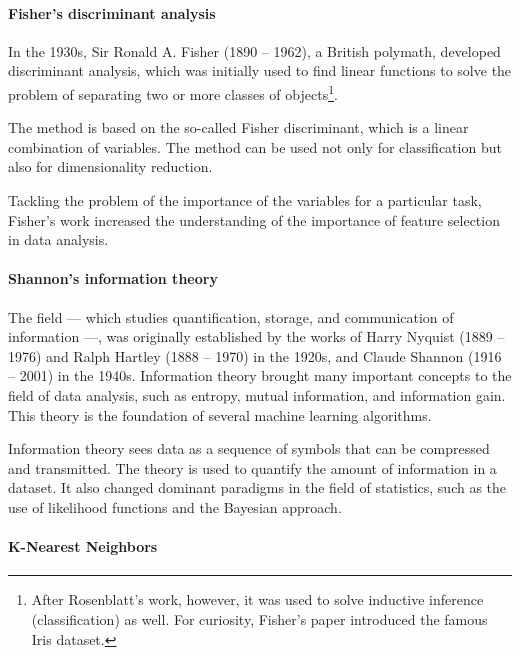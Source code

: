\paragraph{Fisher's discriminant analysis}

In the 1930s, Sir Ronald A. Fisher (1890 -- 1962), a British polymath, developed
discriminant analysis,
which was initially used to find linear functions to solve the problem of separating two or
more classes of objects\footnote{After Rosenblatt's work, however, it was used to solve
inductive inference (classification) as well.  For curiosity, Fisher's paper
introduced the famous Iris dataset.}.

The method is based on the so-called Fisher discriminant, which is a linear
combination of variables.  The method can be used not only for classification but also for
dimensionality reduction.

Tackling the problem of the importance of the variables for a particular task, Fisher's
work increased the understanding of the importance of feature selection in data analysis.


\paragraph{Shannon's information theory}

The field --- which studies quantification, storage, and communication of information ---, was
originally established by the works of Harry Nyquist (1889 -- 1976) and Ralph Hartley
(1888 -- 1970) in the 1920s, and Claude Shannon (1916 -- 2001) in the
1940s.
Information theory brought many important concepts to the field of data analysis, such as
entropy, mutual information, and information gain.  This theory is the foundation of
several machine learning algorithms.

Information theory sees data as a sequence of symbols that can be compressed and
transmitted.  The theory is used to quantify the amount of information in a dataset.
It also changed dominant paradigms in the field of statistics, such as the use of
likelihood functions and the Bayesian approach.


\paragraph{K-Nearest Neighbors}

